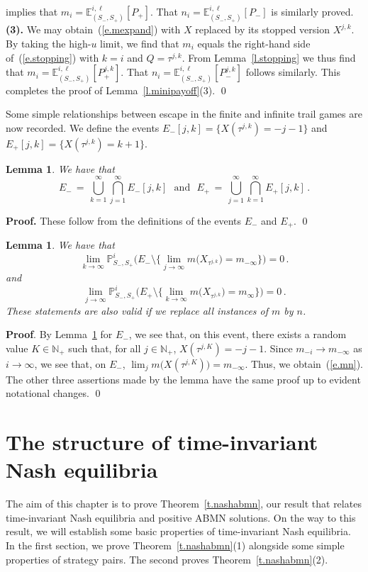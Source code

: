 \documentclass[letterpaper,11pt,oneside,reqno]{amsbook}
\newcommand{\PP}{\ensuremath{\mathbb{P}}}
\newcommand{\N}{\ensuremath{\mathbb{N}}}
\newcommand{\E}[0]{\mathbb{E}}
\numberwithin{figure}{chapter}
\newtheorem{lemma}[theorem]{Lemma}
\theoremstyle{definition}
\theoremstyle{definition}
\theoremstyle{definition}
\theoremstyle{definition}
\theoremstyle{definition}
\newcommand{\nwithoutzero}{\N_+}
\newcommand{\abmnmacspace}{\textrm{ABMN} }
\begin{document}
  implies that $m_i = \E_{(S_-,S_+)}^{i,\ell} [P_+]$. That   $n_i =   \E_{(S_-,S_+)}^{i,\ell} [ P_-]$ is similarly proved. \\
{\bf (3).} We may obtain~(\ref{e.mexpand}) with $X$ replaced by its stopped version $X^{j,k}$.  By taking the high-$u$ limit, we find that $m_i$ equals  the right-hand side of~(\ref{e.stopping}) with $k=i$ and $Q = \tau^{j,k}$.  From Lemma~\ref{l.stopping} we thus find that
   $m_i = \E_{(S_-,S_+)}^{i,\ell} [P^{j,k}_+]$. That   $n_i =   \E_{(S_-,S_+)}^{i,\ell} [ P^{j,k}_-]$ follows similarly. This completes the proof of Lemma~\ref{l.minipayoff}(3). \qed


Some simple relationships between escape in the finite and infinite trail games are now recorded.
We define the events
$E_-[j,k] = \big\{ X(\tau^{j,k}) = - j-1 \big\}$ and $E_+[j,k] = \big\{ X(\tau^{j,k}) = k+1 \big\}$.
\begin{lemma}\label{l.eminuseplus}
We have that
$$
E_- \, = \, \bigcup_{k=1}^\infty \bigcap_{j=1}^\infty E_-[j,k] \, \, \, \, \textrm{and} \, \, \, \, 
E_+ \, = \, \bigcup_{j=1}^\infty \bigcap_{k=1}^\infty E_+[j,k] \, .
$$
\end{lemma}
{\bf Proof.} These follow from the definitions of the events $E_-$ and $E_+$. \qed
\begin{lemma}\label{l.mn} 
We have that
\begin{equation}\label{e.mn}
\lim_{k \to \infty } \PP_{S_-,S_+}^i \bigg( E_- \setminus \Big\{ \lim_{j \to \infty}  m\big( X_{\tau^{j,k}} \big) = m_{-\infty} \Big\} \bigg) = 0 \, .
\end{equation}
and
$$
\lim_{j \to \infty } \PP_{S_-,S_+}^i \bigg( E_+ \setminus \Big\{ \lim_{k \to \infty}  m\big( X_{\tau^{j,k}} \big) = m_\infty \Big\} \bigg) = 0 \, .
$$
These statements are also valid if we replace all instances of $m$ by $n$. 
\end{lemma}
{\bf Proof}. By Lemma~\ref{l.eminuseplus} for $E_-$, we see that, on this event,
there exists a random value $K \in \nwithoutzero$ such that, for all $j \in \nwithoutzero$,
 $X(\tau^{j,K}) = -j-1$. Since $m_{-i} \to m_{-\infty}$ as $i \to \infty$, we see that, on $E_-$, 
$\lim_j m\big( X(\tau^{j,K})\big) = m_{-\infty}$. Thus, we obtain~(\ref{e.mn}). The other three assertions made by the lemma have the same proof up to evident notational changes. \qed
   
 \chapter{The structure of time-invariant Nash equilibria}\label{c.nashabmn}
The aim of this chapter is to prove Theorem~\ref{t.nashabmn}, our result that relates time-invariant Nash equilibria and positive \abmnmacspace solutions. On the way to this result, we will establish some basic properties of time-invariant Nash equilibria. 
In the first section, we prove Theorem~\ref{t.nashabmn}(1) alongside some simple properties of strategy pairs. 
The second proves Theorem~\ref{t.nashabmn}(2). 
\end{document}
